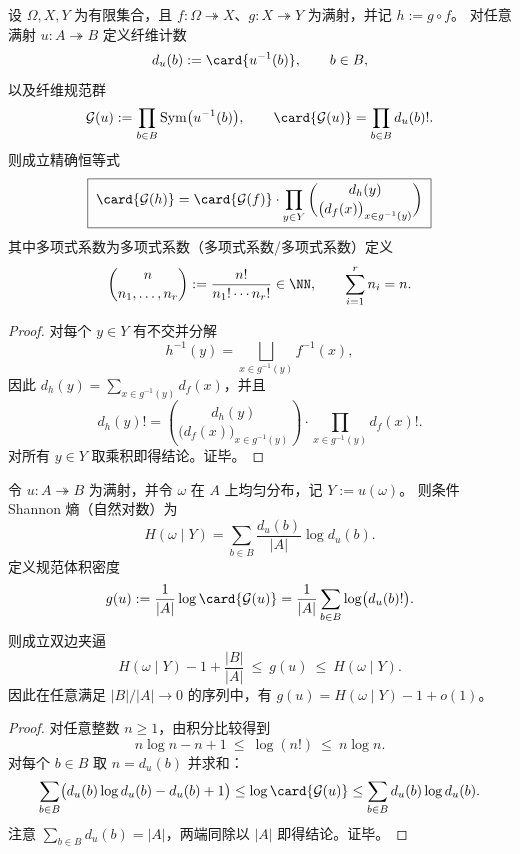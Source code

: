 \begin{theorem}[纤维规范群体积的复合链式分解]\label{thm:fiber-gauge-volume-chain-factorization}
设 \(\Omega,X,Y\) 为有限集合，且 \(f:\Omega\twoheadrightarrow X\)、\(g:X\twoheadrightarrow Y\) 为满射，并记 \(h:=g\circ f\)。
对任意满射 \(u:A\twoheadrightarrow B\) 定义纤维计数
\[
d_u(b):=\card{u^{-1}(b)},\qquad b\in B,
\]
以及纤维规范群
\[
\mathcal{G}(u):=\prod_{b\in B}\mathrm{Sym}\bigl(u^{-1}(b)\bigr),
\qquad
\card{\mathcal{G}(u)}=\prod_{b\in B} d_u(b)!.
\]
则成立精确恒等式
\[
\boxed{\;
\card{\mathcal{G}(h)}
=
\card{\mathcal{G}(f)}
\cdot
\prod_{y\in Y}
\binom{d_h(y)}{\bigl(d_f(x)\bigr)_{x\in g^{-1}(y)}}
\;}
\]
其中多项式系数为多项式系数（多项式系数/多项式系数）定义
\[
\binom{n}{n_1,\dots,n_r}:=\frac{n!}{n_1!\cdots n_r!}\in\NN,
\qquad
\sum_{i=1}^{r}n_i=n.
\]
\end{theorem}

\begin{proof}
对每个 \(y\in Y\) 有不交并分解
\[
h^{-1}(y)=\bigsqcup_{x\in g^{-1}(y)} f^{-1}(x),
\]
因此
\(
d_h(y)=\sum_{x\in g^{-1}(y)} d_f(x)
\)，并且
\[
d_h(y)!
=
\binom{d_h(y)}{\bigl(d_f(x)\bigr)_{x\in g^{-1}(y)}}
\cdot
\prod_{x\in g^{-1}(y)} d_f(x)!.
\]
对所有 \(y\in Y\) 取乘积即得结论。证毕。
\end{proof}

\begin{proposition}\label{prop:fiber-gauge-volume-density-vs-conditional-entropy}
令 \(u:A\twoheadrightarrow B\) 为满射，并令 \(\omega\) 在 \(A\) 上均匀分布，记 \(Y:=u(\omega)\)。
则条件 Shannon 熵（自然对数）为
\[
H(\omega\mid Y)=\sum_{b\in B}\frac{d_u(b)}{|A|}\log d_u(b).
\]
定义规范体积密度
\[
g(u):=\frac{1}{|A|}\log\card{\mathcal{G}(u)}=\frac{1}{|A|}\sum_{b\in B}\log\bigl(d_u(b)!\bigr).
\]
则成立双边夹逼
\[
H(\omega\mid Y)-1+\frac{|B|}{|A|}\ \le\ g(u)\ \le\ H(\omega\mid Y).
\]
因此在任意满足 \(|B|/|A|\to 0\) 的序列中，有 \(g(u)=H(\omega\mid Y)-1+o(1)\)。
\end{proposition}
\begin{proof}
对任意整数 \(n\ge 1\)，由积分比较得到
\[
n\log n-n+1\ \le\ \log(n!)\ \le\ n\log n.
\]
对每个 \(b\in B\) 取 \(n=d_u(b)\) 并求和：
\[
\sum_{b\in B}\bigl(d_u(b)\log d_u(b)-d_u(b)+1\bigr)
\le
\log\card{\mathcal{G}(u)}
\le
\sum_{b\in B} d_u(b)\log d_u(b).
\]
注意 \(\sum_{b\in B}d_u(b)=|A|\)，两端同除以 \(|A|\) 即得结论。证毕。
\end{proof}

